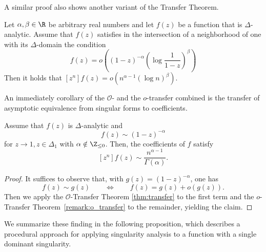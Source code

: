 A similar proof also shows another variant of the Transfer Theorem.

\begin{theorem} 
\label{remark:o_transfer}
  Let $\alpha, \beta \in \R$ be arbitrary real numbers and let $f(z)$ be a function that is $\Delta$-analytic. 
  Assume that $f(z)$ satisfies in the intersection of a neighborhood of one with its $\Delta$-domain the condition 
  $$
    f(z) = o\left((1-z)^{-\alpha} \left(\log \frac{1}{1-z}\right)^\beta\right)
  $$
  Then it holds that $[z^n]f(z) = o(n^{\alpha-1}(\log n)^\beta).$
\end{theorem}

An immediately corollary of the $\mathcal{O}$- and the $o$-transfer combined is the transfer of asymptotic equivalence from singular forms to coefficients.

\begin{corollary}
  Assume that $f(z)$ is $\Delta$-analytic and
  $$
    f(z) \sim (1 - z)^{-\alpha}
  $$
  for $z \to 1, z \in \Delta_1$ with $\alpha \notin \Z_{\leq 0}$. Then, the coefficients of $f$ satisfy
  $$
    [z^n]f(z) \sim \frac{n^{\alpha - 1}}{\Gamma(\alpha)}.
  $$
\end{corollary}

\begin{proof}
  It suffices to observe that, with $g(z) = (1 - z)^{-\alpha}$, one has
  $$
    f(z) \sim g(z) \qquad \iff \qquad f(z) = g(z) + o(g(z)).
  $$
  Then we apply the $\mathcal{O}$-Transfer Theorem \ref{thm:transfer} to the first term and the $o$-Transfer Theorem~\ref{remark:o_transfer} to the remainder, yielding the claim.
\end{proof}

We summarize these finding in the following proposition, which describes a procedural approach for applying singularity analysis to a function with a single dominant singularity.

